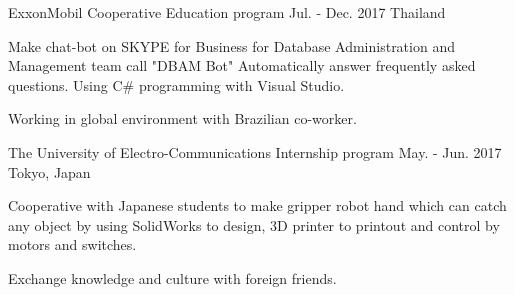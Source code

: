 \begin{cventries}


  \cventry
    {ExxonMobil} %
    {Cooperative Education program} %
    {Jul. - Dec. 2017} %
    {Thailand} %
    {
      \begin{cvitems} %
        \item {Make chat-bot on SKYPE for Business for Database Administration and Management team call "DBAM Bot" Automatically answer frequently asked questions. Using C\# programming with Visual Studio.}
        \item {Working in global environment with Brazilian co-worker.}
      \end{cvitems}
    }

  \cventry
    {The University of Electro-Communications} %
    {Internship program} %
    {May. - Jun. 2017} %
    {Tokyo, Japan} %
    {
      \begin{cvitems} %
        \item {Cooperative with Japanese students to make gripper robot hand which can catch any object by using SolidWorks to design, 3D printer to printout and control by motors and switches.}
        \item {Exchange knowledge and culture with foreign friends.}
      \end{cvitems}
    }

\end{cventries}
